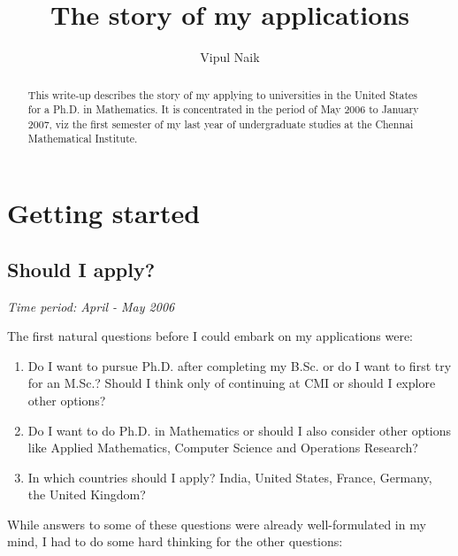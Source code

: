 \documentclass[a4paper]{amsart}
\title{The story of my applications}
\author{Vipul Naik}
\begin{document}
\maketitle

\begin{abstract}
  This write-up describes the story of my applying to universities in
  the United States for a Ph.D. in Mathematics. It is concentrated in
  the period of May 2006 to January 2007, viz the first semester of my
  last year of undergraduate studies at the Chennai Mathematical
  Institute.
\end{abstract}

\section{Getting started}

\subsection{Should I apply?}

{\em Time period: April - May 2006}

The first natural questions before I could embark on my applications were:

\begin{enumerate}

\item Do I want to pursue Ph.D. after completing my B.Sc. or do I
  want to first try for an M.Sc.? Should I think only of continuing at
  CMI or should I explore other options?

\item Do I want to do Ph.D. in Mathematics or should I also consider
  other options like Applied Mathematics, Computer Science and
  Operations Research?

\item In which countries should I apply? India, United States, France,
  Germany, the United Kingdom?

\end{enumerate}

While answers to some of these questions were already well-formulated
in my mind, I had to do some hard thinking for the other questions:
\end{document}
